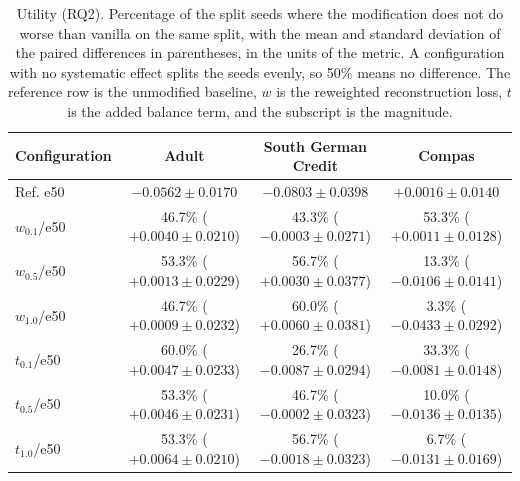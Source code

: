 \begin{table}[t]
\centering
\small
\caption{Utility (RQ2). Percentage of the split seeds where the modification does not do worse than vanilla on the same split, with the mean and standard deviation of the paired differences in parentheses, in the units of the metric. A configuration with no systematic effect splits the seeds evenly, so 50\% means no difference. The reference row is the unmodified baseline, $w$ is the reweighted reconstruction loss, $t$ is the added balance term, and the subscript is the magnitude.}
\label{tab:stats-utility}
\begin{tabular}{p{1.5cm}ccc}
\toprule
Configuration & Adult & South German Credit & Compas \\
\midrule
Ref. e50 & $-0.0562 \pm 0.0170$ & $-0.0803 \pm 0.0398$ & $+0.0016 \pm 0.0140$ \\ \hline
$w_{0.1}$/e50 & \makecell{46.7\% \\ ($+0.0040 \pm 0.0210$)} & \makecell{43.3\% \\ ($-0.0003 \pm 0.0271$)} & \makecell{53.3\% \\ ($+0.0011 \pm 0.0128$)} \\ \hdashline
$w_{0.5}$/e50 & \makecell{53.3\% \\ ($+0.0013 \pm 0.0229$)} & \makecell{56.7\% \\ ($+0.0030 \pm 0.0377$)} & \makecell{13.3\% \\ ($-0.0106 \pm 0.0141$)} \\ \hdashline
$w_{1.0}$/e50 & \makecell{46.7\% \\ ($+0.0009 \pm 0.0232$)} & \makecell{60.0\% \\ ($+0.0060 \pm 0.0381$)} & \makecell{3.3\% \\ ($-0.0433 \pm 0.0292$)} \\ \hdashline
$t_{0.1}$/e50 & \makecell{60.0\% \\ ($+0.0047 \pm 0.0233$)} & \makecell{26.7\% \\ ($-0.0087 \pm 0.0294$)} & \makecell{33.3\% \\ ($-0.0081 \pm 0.0148$)} \\ \hdashline
$t_{0.5}$/e50 & \makecell{53.3\% \\ ($+0.0046 \pm 0.0231$)} & \makecell{46.7\% \\ ($-0.0002 \pm 0.0323$)} & \makecell{10.0\% \\ ($-0.0136 \pm 0.0135$)} \\ \hdashline
$t_{1.0}$/e50 & \makecell{53.3\% \\ ($+0.0064 \pm 0.0210$)} & \makecell{56.7\% \\ ($-0.0018 \pm 0.0323$)} & \makecell{6.7\% \\ ($-0.0131 \pm 0.0169$)} \\

\end{tabular}
\end{table}

